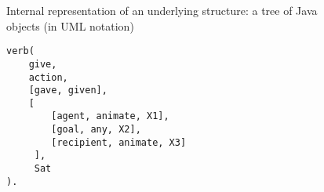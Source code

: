 \documentclass[a4paper, halfparskip, onecolumn, abstracton, final, figurecaptionabove]{scrartcl}
\begin{document}

\begin{figure}
    \begin{center}

   \mbox{}
\caption{Internal representation of an underlying structure: a tree of Java objects (in UML notation)}
\label{uml-tree}
 
    \end{center}
    \end{figure}
    
    \begin{figure}
      \begin{center}

 \begin{verbatim}
verb(
    give, 
    action, 
    [gave, given], 
    [
        [agent, animate, X1], 
        [goal, any, X2],
        [recipient, animate, X3]
     ], 
     Sat
).
\end{verbatim}

 \label{prolog-2}

    \end{center}
\end{figure}
\end{document}
